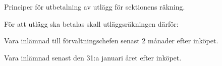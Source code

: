 \documentclass[10pt]{article}
\begin{document}
\section*{\doctitle}

Principer för utbetalning av utlägg för sektionens räkning.

För att utlägg ska betalas skall utläggsräkningen därför:

\begin{dashlist}
	\item Vara inlämnad till förvaltningschefen senast 2 månader efter inköpet.
	\item Vara inlämnad senast den 31:a januari året efter inköpet.
\end{dashlist}
\end{document}
